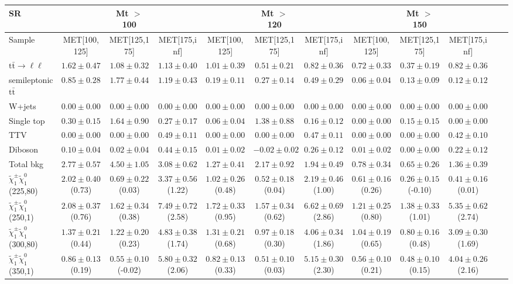 \begin{table}
\begin{center}
\small
\begin{tabular}{lccccccccccc}
\hline
SR & & Mt $>$ 100 & & & Mt $>$ 120 & & &Mt $>$ 150 & & &\\
\hline
Sample&MET[100,125]&MET[125,175]&MET[175,inf]&MET[100,125]&MET[125,175]&MET[175,inf]&MET[100,125]&MET[125,175]&MET[175,inf]&\\
\hline
$\mathrm{t}\bar{\mathrm{t}}\rightarrow \ell\ell$&$1.62\pm0.47$&$1.08\pm0.32$&$1.13\pm0.40$&$1.01\pm0.39$&$0.51\pm0.21$&$0.82\pm0.36$&$0.72\pm0.33$&$0.37\pm0.19$&$0.82\pm0.36$\\
semileptonic $\mathrm{t}\bar{\mathrm{t}}$&$0.85\pm0.28$&$1.77\pm0.44$&$1.19\pm0.43$&$0.19\pm0.11$&$0.27\pm0.14$&$0.49\pm0.29$&$0.06\pm0.04$&$0.13\pm0.09$&$0.12\pm0.12$\\
W+jets&$0.00\pm0.00$&$0.00\pm0.00$&$0.00\pm0.00$&$0.00\pm0.00$&$0.00\pm0.00$&$0.00\pm0.00$&$0.00\pm0.00$&$0.00\pm0.00$&$0.00\pm0.00$\\
Single top&$0.30\pm0.15$&$1.64\pm0.90$&$0.27\pm0.17$&$0.06\pm0.04$&$1.38\pm0.88$&$0.16\pm0.12$&$0.00\pm0.00$&$0.15\pm0.15$&$0.00\pm0.00$\\
TTV&$0.00\pm0.00$&$0.00\pm0.00$&$0.49\pm0.11$&$0.00\pm0.00$&$0.00\pm0.00$&$0.47\pm0.11$&$0.00\pm0.00$&$0.00\pm0.00$&$0.42\pm0.10$\\
Diboson&$0.10\pm0.04$&$0.02\pm0.04$&$0.44\pm0.15$&$0.01\pm0.02$&$-0.02\pm0.02$&$0.26\pm0.12$&$0.01\pm0.02$&$0.00\pm0.00$&$0.22\pm0.12$\\
\hline
Total bkg&$2.77\pm0.57$&$4.50\pm1.05$&$3.08\pm0.62$&$1.27\pm0.41$&$2.17\pm0.92$&$1.94\pm0.49$&$0.78\pm0.34$&$0.65\pm0.26$&$1.36\pm0.39$\\
$\tilde{\chi}_{1}^{\pm}\tilde{\chi}_{1}^{0}$ (225,80)&$2.02\pm0.40$(0.73)&$0.69\pm0.22$(0.03)&$3.37\pm0.56$(1.22)&$1.02\pm0.26$(0.48)&$0.52\pm0.18$(0.04)&$2.19\pm0.46$(1.00)&$0.61\pm0.16$(0.26)&$0.26\pm0.15$(-0.10)&$0.41\pm0.16$(0.01)\\
$\tilde{\chi}_{1}^{\pm}\tilde{\chi}_{1}^{0}$ (250,1)&$2.08\pm0.37$(0.76)&$1.62\pm0.34$(0.38)&$7.49\pm0.72$(2.58)&$1.72\pm0.33$(0.95)&$1.57\pm0.34$(0.62)&$6.62\pm0.69$(2.86)&$1.21\pm0.25$(0.80)&$1.38\pm0.33$(1.01)&$5.35\pm0.62$(2.74)\\
$\tilde{\chi}_{1}^{\pm}\tilde{\chi}_{1}^{0}$ (300,80)&$1.37\pm0.21$(0.44)&$1.22\pm0.20$(0.23)&$4.83\pm0.38$(1.74)&$1.31\pm0.21$(0.68)&$0.97\pm0.18$(0.30)&$4.06\pm0.34$(1.86)&$1.04\pm0.19$(0.65)&$0.80\pm0.16$(0.48)&$3.09\pm0.30$(1.69)\\
$\tilde{\chi}_{1}^{\pm}\tilde{\chi}_{1}^{0}$ (350,1)&$0.86\pm0.13$(0.19)&$0.55\pm0.10$(-0.02)&$5.80\pm0.32$(2.06)&$0.82\pm0.13$(0.33)&$0.51\pm0.10$(0.03)&$5.15\pm0.30$(2.30)&$0.56\pm0.10$(0.21)&$0.48\pm0.10$(0.15)&$4.04\pm0.26$(2.16)\\
\hline
\hline\hline
\end{tabular}
\end{center}
\end{table}

